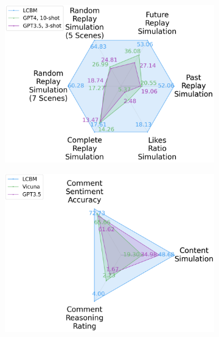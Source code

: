 \begin{figure}[!t]
{{\begin{subfigure}[b]{0.25\textwidth}
\includegraphics[width=1\textwidth]{images/accuracy_scores_final.pdf}\caption{}    
\end{subfigure}
\begin{subfigure}[b]{0.25\textwidth}
    \includegraphics[width=1\textwidth]{images/content_simulation_scores.pdf}
    \caption{}
\end{subfigure}
\begin{subfigure}[b]{0.24\textwidth}

\end{subfigure}}}
\end{figure}
